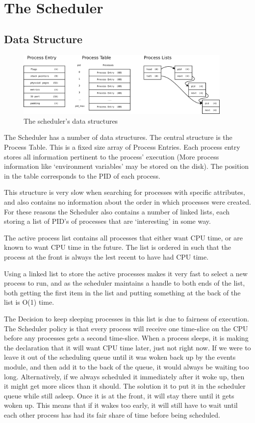 \documentclass[a4paper]{report}
\begin{document}
\clearpage
\section{The Scheduler}


\subsection{Data Structure}

\begin{figure}[ht]
\centering
\includegraphics[width=400px]{images/Scheduler_Structure}
\caption{The scheduler's data structures}
\label{fig:WinTitleBarScreen}
\end{figure}


The Scheduler has a number of data structures. The central structure is the Process Table. This is a fixed size array of Process Entries. Each process entry stores all information pertinent to the process' execution (More process information like `environment variables' may be stored on the disk). The position in the table corresponds to the PID of each process.

This structure is very slow when searching for processes with specific attributes, and also contains no information about the order in which processes were created. For these reasons the Scheduler also contains a number of linked lists, each storing a list of PID's of processes that are `interesting' in some way.

The active process list contains all processes that either want CPU time, or are known to want CPU time in the future. The list is ordered in such that the process at the front is always the lest recent to have had CPU time.

Using a linked list to store the active processes makes it very fast to select a new process to run, and as the scheduler maintains a handle to both ends of the list, both getting the first item in the list and putting something at the back of the list is O(1) time.

The Decision to keep sleeping processes in this list is due to fairness of execution. The Scheduler policy is that every process will receive one time-slice on the CPU before any processes gets a second time-slice. When a process sleeps, it is making the declaration that it will want CPU time later, just not right now. If we were to leave it out of the scheduling queue until it was woken back up by the events module, and then add it to the back of the queue, it would always be waiting too long. Alternatively, if we always scheduled it immediately after it woke up, then it might get more slices than it should. The solution it to put it in the scheduler queue while still asleep. Once it is at the front, it will stay there until it gets woken up. This means that if it wakes too early, it will still have to wait until each other process has had its fair share of time before being scheduled.
\end{document}
